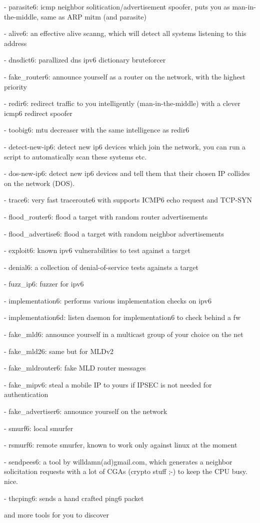 \documentclass[18pt,landscape,a4paper,footrule]{foils}
\begin{document}
\begin{list2}
\item - parasite6: icmp neighbor solitication/advertisement spoofer, puts you
   as man-in-the-middle, same as ARP mitm (and parasite)
\item - alive6: an effective alive scanng, which will detect all systems
   listening to this address
\item - dnsdict6: parallized dns ipv6 dictionary bruteforcer
\item - fake\_router6: announce yourself as a router on the network, with the
  highest priority
\item - redir6: redirect traffic to you intelligently (man-in-the-middle) with
    a clever icmp6 redirect spoofer
\item - toobig6: mtu decreaser with the same intelligence as redir6
\item - detect-new-ip6: detect new ip6 devices which join the network, you can
    run a script to automatically scan these systems etc.
\item - dos-new-ip6: detect new ip6 devices and tell them that their chosen IP
    collides on the network (DOS).
\item - trace6: very fast traceroute6 with supports ICMP6 echo request and TCP-SYN
\item - flood\_router6: flood a target with random router advertisements
\item - flood\_advertise6: flood a target with random neighbor advertisements
\item - exploit6: known ipv6 vulnerabilities to test against a target
\item - denial6: a collection of denial-of-service tests againsts a target
\item - fuzz\_ip6: fuzzer for ipv6
\item - implementation6: performs various implementation checks on ipv6
\item - implementation6d: listen daemon for implementation6 to check behind a fw
\item - fake\_mld6: announce yourself in a multicast group of your choice on the net
\item - fake\_mld26: same but for MLDv2
\item - fake\_mldrouter6: fake MLD router messages
\item - fake\_mipv6: steal a mobile IP to yours if IPSEC is not needed for authentication
\item - fake\_advertiser6: announce yourself on the network
\item - smurf6: local smurfer
\item - rsmurf6: remote smurfer, known to work only against linux at the moment
\item - sendpees6: a tool by willdamn(ad)gmail.com, which generates a neighbor
          solicitation requests with a lot of CGAs (crypto stuff ;-) to keep the CPU busy. nice.
\item         - thcping6: sends a hand crafted ping6 packet
\item         [and more tools for you to discover]

\end{list2}
\end{document}
